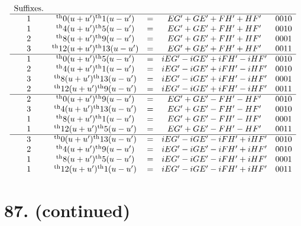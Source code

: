 \documentclass[11pt,a4paper]{book}
\providecommand{\uth}{\textsuperscript{th}}
\begin{document}
\[
\begin{array}{ccccc}
\text{Suffixes.} & & & & \\
\hline
1 & \uth{0}(u+u')\uth{1}(u-u') &=& EG' + GE' + FH' + HF' & 0010 \\
1 & \uth{4}(u+u')\uth{5}(u-u') &=& EG' + GE' + FH' + HF' & 0010 \\
2 & \uth{8}(u+u')\uth{9}(u-u') &=& EG' + GE' + FH' + HF' & 0001 \\
3 & \uth{12}(u+u')\uth{13}(u-u') &=& EG' + GE' + FH' + HF' & 0011 \\
\hline
1 & \uth{0}(u+u')\uth{5}(u-u') &=& iEG' - iGE' + iFH' - iHF' & 0010 \\
2 & \uth{4}(u+u')\uth{1}(u-u') &=& iEG' - iGE' + iFH' - iHF' & 0010 \\
3 & \uth{8}(u+u')\uth{13}(u-u') &=& iEG' - iGE' + iFH' - iHF' & 0001 \\
2 & \uth{12}(u+u')\uth{9}(u-u') &=& iEG' - iGE' + iFH' - iHF' & 0011 \\
\hline
2 & \uth{0}(u+u')\uth{9}(u-u') &=& EG' + GE' - FH' - HF' & 0010 \\
3 & \uth{4}(u+u')\uth{13}(u-u') &=& EG' + GE' - FH' - HF' & 0010 \\
1 & \uth{8}(u+u')\uth{1}(u-u') &=& EG' + GE' - FH' - HF' & 0001 \\
1 & \uth{12}(u+u')\uth{5}(u-u') &=& EG' + GE' - FH' - HF' & 0011 \\
\hline
3 & \uth{0}(u+u')\uth{13}(u-u') &=& iEG' - iGE' - iFH' + iHF' & 0010 \\
2 & \uth{4}(u+u')\uth{9}(u-u') &=& iEG' - iGE' - iFH' + iHF' & 0010 \\
1 & \uth{8}(u+u')\uth{5}(u-u') &=& iEG' - iGE' - iFH' + iHF' & 0001 \\
1 & \uth{12}(u+u')\uth{1}(u-u') &=& iEG' - iGE' - iFH' + iHF' & 0011
\end{array}
\]

\newpage
\section*{87. (continued)}
\label{sec:87cont2}
\end{document}
